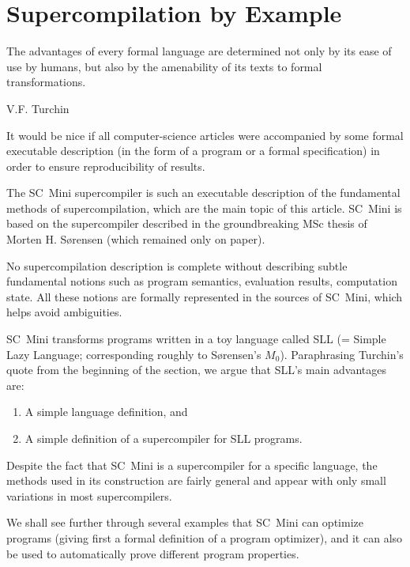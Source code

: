 \section{Supercompilation by Example}
\epigraph{The advantages of every formal language are determined not only
by its ease of use by humans, but also by the amenability of its texts to 
formal transformations.}{V.F. Turchin \cite{Turchin1974EqTrans}}

It would be nice if all computer-science articles were accompanied by some formal 
executable description (in the form of a program or a formal specification)
in order to ensure reproducibility of results.

The SC~Mini supercompiler is such an executable description of the fundamental 
methods of supercompilation, which are the main topic of this article.
SC~Mini is based on the supercompiler described in the groundbreaking
MSc thesis of Morten H. S{\o}rensen
\cite{Sorensen1994TurchinSupercompiler} 
(which remained only on paper).

No supercompilation description is complete without describing subtle fundamental notions
such as program semantics, evaluation results, computation state. 
All these notions are formally represented in the sources of SC~Mini, which helps
avoid ambiguities.

SC~Mini transforms programs written in a toy language called SLL
(= Simple Lazy Language; corresponding roughly to 
S{\o}rensen's $M_0$).
Paraphrasing Turchin's quote from the beginning of the section, we argue
that SLL's main advantages are:
\begin{enumerate}
  \item A simple language definition, and
  \item A simple definition of a supercompiler for SLL programs.
\end{enumerate}

Despite the fact that SC~Mini is a supercompiler for a specific language, the methods used 
in its construction are fairly general and appear with only small variations in most supercompilers.

We shall see further through several examples that SC~Mini can optimize programs 
(giving first a formal definition of a program optimizer),
and it can also be used to automatically prove different program properties.

%

